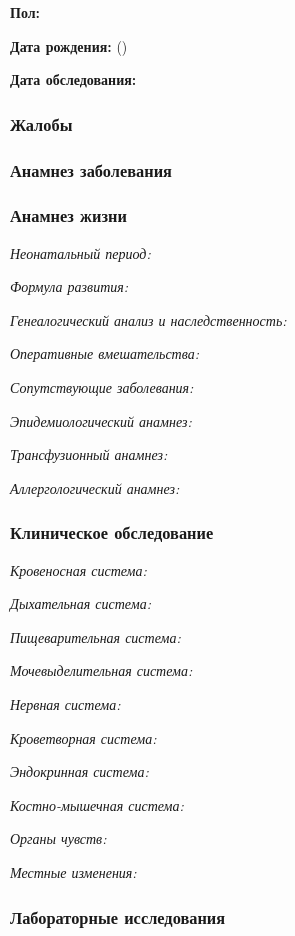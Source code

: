 \documentclass[a4paper,14pt]{extarticle}
\begin{document}
\textbf{Пол:}

\textbf{Дата рождения:}  ()

\textbf{Дата обследования:} 

\subsubsection*{Жалобы}

\subsubsection*{Анамнез заболевания}

\subsubsection*{Анамнез жизни}

\emph{Неонатальный период:}

\emph{Формула развития:}

\emph{Генеалогический анализ и наследственность:}

\emph{Оперативные вмешательства:}

\emph{Сопутствующие заболевания:}

\emph{Эпидемиологический анамнез:}

\emph{Трансфузионный анамнез:}

\emph{Аллергологический анамнез:}

\subsubsection*{Клиническое обследование}

\emph{Кровеносная система:}

\emph{Дыхательная система:}

\emph{Пищеварительная система:}

\emph{Мочевыделительная система:}

\emph{Нервная система:} 

\emph{Кроветворная система:}

\emph{Эндокринная система:}

\emph{Костно-мышечная система:}

\emph{Органы чувств:}

\emph{Местные изменения:}

\subsubsection*{Лабораторные исследования}
\end{document}
